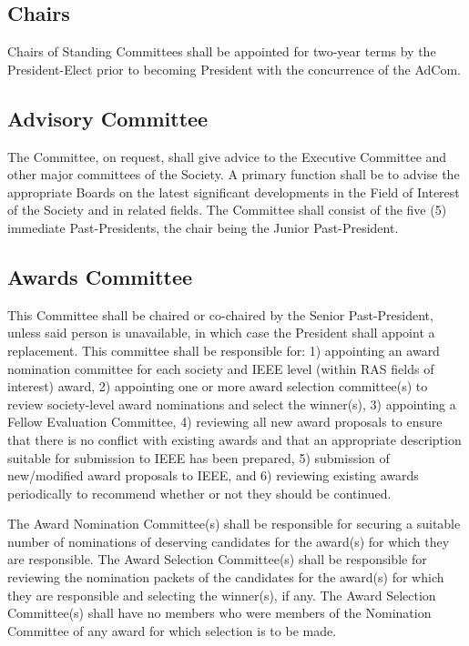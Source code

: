 \documentclass[10pt]{article}
\begin{document}
\subsection{Chairs}

Chairs of Standing Committees shall be appointed for two-year terms by the President-Elect prior to becoming President with the concurrence of the AdCom.

\subsection{Advisory Committee}

The Committee, on request, shall give advice to the Executive Committee and other major committees of the Society. A primary function shall be to advise the appropriate Boards on the latest significant developments in the Field of Interest of the Society and in related fields. The Committee shall consist of the five (5) immediate Past-Presidents, the chair being the Junior Past-President.

\subsection{Awards Committee}

This Committee shall be chaired or co-chaired by the Senior Past-President, unless said person is unavailable, in which case the President shall appoint a replacement. This committee shall be responsible for: 1) appointing an award nomination committee for each society and IEEE level (within RAS fields of interest) award, 2) appointing one or more award selection committee(s) to review society-level award nominations and select the winner(s), 3) appointing a Fellow Evaluation Committee, 4) reviewing all new award proposals to ensure that there is no conflict with existing awards and that an appropriate description suitable for submission to IEEE has been prepared, 5) submission of new/modified award proposals to IEEE, and 6) reviewing existing awards periodically to recommend whether or not they should be continued.  

The Award Nomination Committee(s) shall be responsible for securing a suitable number of nominations of deserving candidates for the award(s) for which they are responsible.  The Award Selection Committee(s) shall be responsible for reviewing the nomination packets of the candidates for the award(s) for which they are responsible and selecting the winner(s), if any. The Award Selection Committee(s) shall have no members who were members of the Nomination Committee of any award for which selection is to be made.
\end{document}
